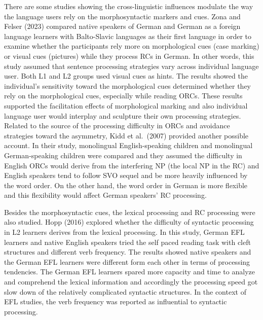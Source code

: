 \documentclass[
]{article}
\begin{document}
There are some studies showing the cross-linguistic influences modulate
the way the language users rely on the morphosyntactic markers and cues.
Zona and Felser (2023) compared native speakers of German and German as
a foreign language learners with Balto-Slavic languages as their first
language in order to examine whether the participants rely more on
morphological cues (case marking) or visual cues (pictures) while they
process RCs in German. In other words, this study assumed that sentence
processing strategies vary across individual language user. Both L1 and
L2 groups used visual cues as hints. The results showed the individual's
sensitivity toward the morphological cues determined whether they rely
on the morphological cues, especially while reading ORCs. These results
supported the facilitation effects of morphological marking and also
individual language user would interplay and sculpture their own
processing strategies. Related to the source of the processing
difficulty in ORCs and avoidance strategies toward the asymmetry, Kidd
et al.~(2007) provided another possible account. In their study,
monolingual English-speaking children and monolingual German-speaking
children were compared and they assumed the difficulty in English ORCs
would derive from the interfering NP (the local NP in the RC) and
English speakers tend to follow SVO sequel and be more heavily
influenced by the word order. On the other hand, the word order in
German is more flexible and this flexibility would affect German
speakers' RC processing.

Besides the morphosyntactic cues, the lexical processing and RC
processing were also studied. Hopp (2016) explored whether the
difficulty of syntactic processing in L2 learners derives from the
lexical processing. In this study, German EFL learners and native
English speakers tried the self paced reading task with cleft structures
and different verb frequency. The results showed native speakers and the
German EFL learners were different form each other in terms of
processing tendencies. The German EFL learners spared more capacity and
time to analyze and comprehend the lexical information and accordingly
the processing speed got slow down of the relatively complicated
syntactic structures. In the context of EFL studies, the verb frequency
was reported as influential to syntactic processing.
\end{document}
